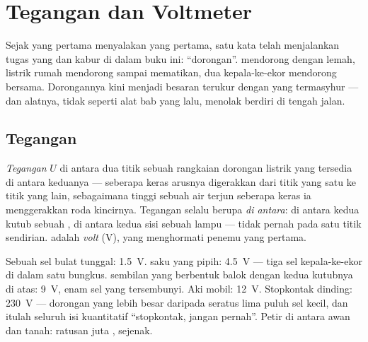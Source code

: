 \chapter{Tegangan dan Voltmeter}\label{ch:g8:voltage-voltmeter}

Sejak  yang pertama menyalakan  yang pertama, satu kata
telah menjalankan tugas yang  dan kabur di dalam buku ini:
``dorongan''.  mendorong dengan lemah, listrik rumah mendorong
sampai mematikan, dua  kepala-ke-ekor mendorong bersama.
Dorongannya kini menjadi besaran terukur dengan  yang termasyhur
--- dan alatnya, tidak seperti alat bab yang lalu, menolak berdiri di
tengah jalan.

\section{Tegangan}

\begin{definition}[Tegangan]\label{def:g8:voltage-voltmeter:voltage}
\emph{Tegangan} $U$ di antara dua titik sebuah
rangkaian  dorongan listrik yang tersedia di antara keduanya
--- seberapa keras arusnya digerakkan dari titik yang satu ke titik
yang lain, sebagaimana tinggi sebuah air terjun  seberapa
keras ia menggerakkan roda kincirnya. Tegangan selalu berupa
\emph{di antara}: di antara kedua kutub sebuah , di antara
kedua sisi sebuah lampu --- tidak pernah pada satu titik sendirian.
 adalah \emph{volt} (\unit{V}), yang menghormati
penemu  yang pertama.
\end{definition}

\begin{example}\label{ex:g8:voltage-voltmeter:values}
Sebuah sel bulat tunggal: \qty{1.5}{V}.  saku yang pipih:
\qty{4.5}{V} --- tiga sel kepala-ke-ekor di dalam satu bungkus.
 sembilan  yang berbentuk balok dengan kedua kutubnya di
atas: \qty{9}{V}, enam sel yang tersembunyi. Aki mobil: \qty{12}{V}.
Stopkontak dinding: \qty{230}{V} --- dorongan yang lebih besar
daripada seratus lima puluh sel kecil, dan itulah seluruh isi
kuantitatif ``stopkontak, jangan pernah''. Petir di antara awan dan
tanah: ratusan juta , sejenak.
\end{example}

